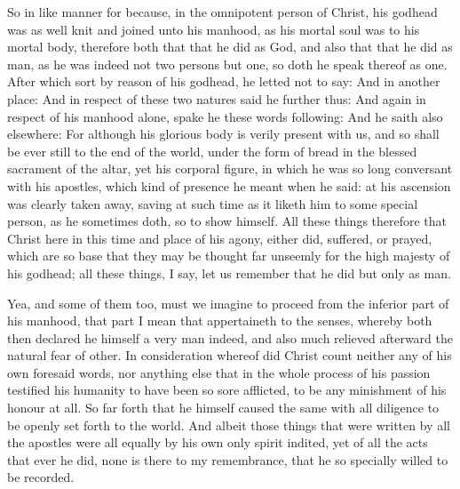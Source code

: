 \documentclass[a5paper]{scrbook}
\begin{document}
	So in like manner for because, in the omnipotent person of Christ, his godhead was as well knit and joined unto his manhood, as his mortal soul was to his mortal body, therefore both that that he did as God, and also that that he did as man, as he was indeed not two persons but one, so doth he speak thereof as one. After which sort by reason of his godhead, he letted not to say:  And in another place:  And in respect of these two natures said he further thus:  And again in respect of his manhood alone, spake he these words following:  And he saith also elsewhere:  For although his glorious body is verily present with us, and so shall be ever still to the end of the world, under the form of bread in the blessed sacrament of the altar, yet his corporal figure, in which he was so long conversant with his apostles, which kind of presence he meant when he said:  at his ascension was clearly taken away, saving at such time as it liketh him to some special person, as he sometimes doth, so to show himself. All these things therefore that Christ here in this time and place of his agony, either did, suffered, or prayed, which are so base that they may be thought far unseemly for the high majesty of his godhead; all these things, I say, let us remember that he did but only as man.
	
	Yea, and some of them too, must we imagine to proceed from the inferior part of his manhood, that part I mean that appertaineth to the senses, whereby both then declared he himself a very man indeed, and also much relieved afterward the natural fear of other. In consideration whereof did Christ count neither any of his own foresaid words, nor anything else that in the whole process of his passion testified his humanity to have been so sore afflicted, to be any minishment of his honour at all. So far forth that he himself caused the same with all diligence to be openly set forth to the world. And albeit those things that were written by all the apostles were all equally by his own only spirit indited, yet of all the acts that ever he did, none is there to my remembrance, that he so specially willed to be recorded.
	
\end{document}
